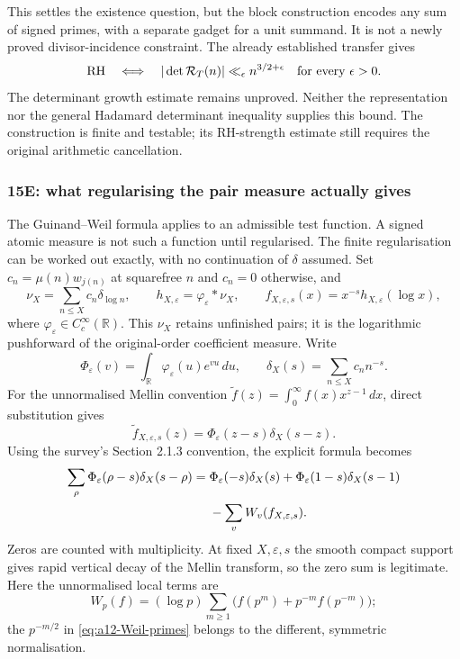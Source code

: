 \documentclass[11pt]{amsart}
\numberwithin{equation}{section}
\theoremstyle{plain}
\theoremstyle{definition}
\theoremstyle{remark}
\begin{document}
This settles the existence question, but the block construction encodes
any sum of signed primes, with a separate gadget for a unit summand.
It is not a newly proved divisor-incidence constraint.
The already established transfer gives
\begin{equation}
\label{eq:a12-det-RH}
\mathrm{RH}\quad\Longleftrightarrow\quad
|\det\mathcal R_T(n)|\ll_\epsilon n^{3/2+\epsilon}
\quad\hbox{for every }\epsilon>0.
\end{equation}
The determinant growth estimate remains unproved.
Neither the representation nor the general Hadamard determinant
inequality supplies this bound. The construction is finite and testable;
its RH-strength estimate still requires the original arithmetic cancellation.

\subsubsection{15E: what regularising the pair measure actually gives}
\label{subsubsec:a12-GW}
The Guinand--Weil formula applies to an admissible test function.
A signed atomic measure is not such a function until regularised.
The finite regularisation can be worked out exactly, with no continuation
of $\delta$ assumed.
Set $c_n=\mu(n)w_{j(n)}$ at squarefree $n$ and $c_n=0$ otherwise, and
\begin{equation}
\label{eq:a12-GW-regularise}
\nu_X=\sum_{n\le X}c_n\delta_{\log n},\qquad
h_{X,\varepsilon}=\varphi_\varepsilon*\nu_X,\qquad
f_{X,\varepsilon,s}(x)=x^{-s}h_{X,\varepsilon}(\log x),
\end{equation}
where $\varphi_\varepsilon\in C_c^\infty(\mathbb R)$.
This $\nu_X$ retains unfinished pairs; it is the logarithmic pushforward
of the original-order coefficient measure. Write
\begin{equation}
\label{eq:a12-Phi-eps}
\Phi_\varepsilon(v)=\int_{\mathbb R}\varphi_\varepsilon(u)e^{vu}\,du,
\qquad \delta_X(s)=\sum_{n\le X}c_nn^{-s}.
\end{equation}
For the unnormalised Mellin convention
$\widetilde f(z)=\int_0^\infty f(x)x^{z-1}\,dx$, direct substitution gives
\begin{equation}
\label{eq:a12-GW-Mellin}
\widetilde f_{X,\varepsilon,s}(z)
=\Phi_\varepsilon(z-s)\delta_X(s-z).
\end{equation}
Using the survey's Section 2.1.3 convention, the explicit formula becomes
\begin{align}
\sum_\rho\Phi_\varepsilon(\rho-s)\delta_X(s-\rho)
={}&\Phi_\varepsilon(-s)\delta_X(s)
+\Phi_\varepsilon(1-s)\delta_X(s-1)\notag\\
&-\sum_v W_v(f_{X,\varepsilon,s}).
\label{eq:a12-GW-finite}
\end{align}
Zeros are counted with multiplicity. At fixed $X,\varepsilon,s$ the
smooth compact support gives rapid vertical decay of the Mellin
transform, so the zero sum is legitimate. Here the unnormalised local
terms are
\begin{equation}
\label{eq:a12-GW-local}
W_p(f)=(\log p)\sum_{m\ge1}
\bigl(f(p^m)+p^{-m}f(p^{-m})\bigr);
\end{equation}
the $p^{-m/2}$ in \eqref{eq:a12-Weil-primes} belongs to the different,
symmetric normalisation.
\end{document}

